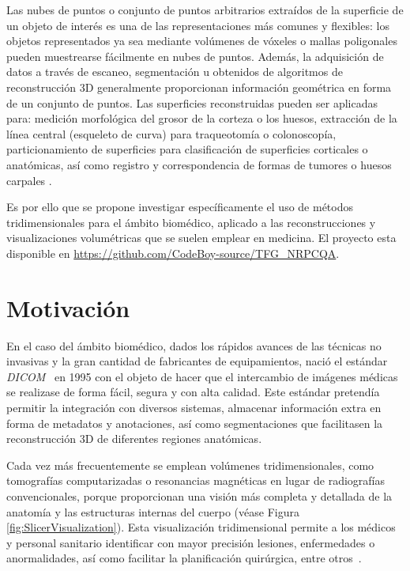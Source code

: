 Las nubes de puntos o conjunto de puntos arbitrarios extraídos de la superficie 
de un objeto de interés es una de las representaciones más comunes y flexibles:
los objetos representados ya sea mediante volúmenes de vóxeles o mallas poligonales
pueden muestrearse fácilmente en nubes de puntos. Además, la adquisición de 
datos a través de escaneo, segmentación u obtenidos de algoritmos de reconstrucción 
3D generalmente proporcionan información geométrica en forma de un conjunto de puntos. 
Las superficies reconstruidas pueden ser aplicadas para:
medición morfológica del grosor de la corteza o los huesos,
extracción de la línea central (esqueleto de curva) para traqueotomía o colonoscopía,
particionamiento de superficies para clasificación de superficies corticales o
anatómicas, así como registro y correspondencia de formas de tumores o huesos carpales 
\cite{WhyUsePointCloud}.

Es por ello que se propone investigar específicamente el uso de métodos tridimensionales
para el ámbito biomédico, aplicado a las reconstrucciones y visualizaciones volumétricas 
que se suelen emplear en medicina. El proyecto esta disponible en \url{https://github.com/CodeBoy-source/TFG_NRPCQA}.

\section{Motivación}
 
En el caso del ámbito biomédico, dados los rápidos avances 
de las técnicas no invasivas y la gran cantidad de fabricantes 
de equipamientos, nació el estándar \emph{DICOM}~\cite{Parisot1995} en 1995 
con el objeto de hacer que el intercambio de imágenes médicas se realizase de forma 
fácil, segura y con alta calidad. Este estándar pretendía permitir la integración con diversos sistemas, 
almacenar información extra en forma de metadatos y anotaciones, así como segmentaciones que facilitasen la reconstrucción 3D de diferentes regiones anatómicas.

Cada vez más frecuentemente se emplean volúmenes tridimensionales, como tomografías computarizadas o
resonancias magnéticas en lugar de radiografías convencionales, porque 
proporcionan una visión más completa y detallada de la anatomía y las estructuras 
internas del cuerpo (véase Figura \ref{fig:SlicerVisualization}). 
Esta visualización tridimensional permite a los médicos y personal sanitario 
identificar con mayor precisión lesiones, enfermedades o anormalidades,
así como facilitar la planificación quirúrgica, entre otros~\cite{3DImagingInMedicine, 3DImagingInMedicine2, ADAS3D}.
 
